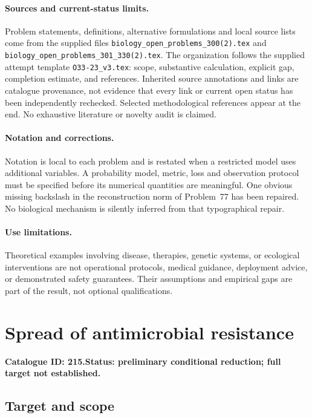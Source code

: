\documentclass[11pt]{article}
\begin{document}
\paragraph{Sources and current-status limits.}
Problem statements, definitions, alternative formulations and local source lists
come from the supplied files
\texttt{biology\_open\_problems\_300(2).tex} and
\texttt{biology\_open\_problems\_301\_330(2).tex}.
The organization follows the supplied attempt template
\texttt{O33-23\_v3.tex}: scope, substantive calculation, explicit gap,
completion estimate, and references. Inherited source annotations and links are
catalogue provenance, not evidence that every link or current open status has
been independently rechecked. Selected methodological references appear at the
end. No exhaustive literature or novelty audit is claimed.

\paragraph{Notation and corrections.}
Notation is local to each problem and is restated when a restricted model uses
additional variables. A probability model, metric, loss and observation protocol
must be specified before its numerical quantities are meaningful. One obvious
missing backslash in the reconstruction norm of Problem~77 has been repaired.
No biological mechanism is silently inferred from that typographical repair.

\paragraph{Use limitations.}
Theoretical examples involving disease, therapies, genetic systems, or ecological
interventions are not operational protocols, medical guidance, deployment advice,
or demonstrated safety guarantees. Their assumptions and empirical gaps are part
of the result, not optional qualifications.

\setcounter{section}{214}
\section{Spread of antimicrobial resistance}
\label{prob:215}
\noindent\textbf{Catalogue ID: 215.}\quad \textbf{Status: preliminary conditional reduction; full target not established.}
\subsection{Target and scope}
\end{document}
